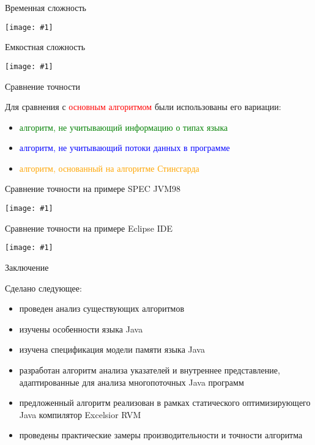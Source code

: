 \documentclass[usenames,dvipsnames,pdftex,unicode]{beamer}
\newcommand{\inputplot}[1]{\centering\texttt{[image: \#1]}}
\begin{document}
\begin{frame}{Временная сложность}

  \inputplot{simple_ops}

\end{frame}

\begin{frame}{Емкостная сложность}

  \inputplot{mem_used}

\end{frame}

\begin{frame}{Сравнение точности}

  Для сравнения с \textcolor{Red}{основным алгоритмом} были использованы его
  вариации:
  \begin{itemize}
    \item \textcolor{Green}{алгоритм, не учитывающий информацию о типах языка}
    \item \textcolor{Blue}{алгоритм, не учитывающий потоки данных в программе}
    \item \textcolor{Orange}{алгоритм, основанный на алгоритме Стинсгарда}
  \end{itemize}

\end{frame}

\begin{frame}{Сравнение точности на примере SPEC JVM98}

  \inputplot{specjvm_all_aliases_distribution_cumulative}

\end{frame}

\begin{frame}{Сравнение точности на примере Eclipse IDE}

  \inputplot{eclipse_all_aliases_distribution_cumulative}

\end{frame}

\begin{frame}{Заключение}

  Сделано следующее:
  \begin{itemize}
    \item проведен анализ существующих алгоритмов
    \item изучены особенности языка Java
    \item изучена спецификация модели памяти языка Java
    \item разработан алгоритм анализа указателей и внутреннее представление,
          адаптированные для анализа многопоточных Java программ
    \item предложенный алгоритм реализован в рамках статического
          оптимизирующего Java компилятор Excelsior RVM
    \item проведены практические замеры производительности и точности алгоритма
  \end{itemize}

\end{frame}
\end{document}
